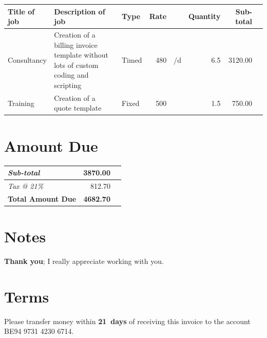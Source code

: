 \documentclass[a4paper,table]{article}
\begin{document}
\extrarowsep=1mm

\begin{center}
\label{tab:orgtable1}

\begin{tabu}{lXlrlrrl}
Title of job & Description of job & Type & Rate &  & Quantity & Sub-total & \\
\hline
Consultancy & Creation of a billing invoice template without lots of custom coding and scripting & Timed & 480 & \texteuro{}/d & 6.5 & 3120.00 & \texteuro{}\\
\hline
Training & Creation of a quote template & Fixed & 500 & \texteuro{} & 1.5 & 750.00 & \texteuro{}\\
\end{tabu}
\end{center}

\section*{Amount Due}
\label{sec:orgheadline2}

\hfill\colorbox{prlp-gray96}{\begin{minipage}{7.5cm}
\begin{center}
\begin{tabu}{Xrl}
\emph{Sub-total} & 3870.00 & \texteuro{}\\
\hline
\emph{Tax @ 21\%} & 812.70 & \texteuro{}\\
\hline
\textbf{Total Amount Due} & \textbf{\large{4682.70}} & \textbf{\texteuro{}}\\
\end{tabu}
\end{center}

\end{minipage}}

\section*{Notes}
\label{sec:orgheadline3}
\textbf{Thank you}; I really appreciate working with you.

\section*{Terms}
\label{sec:orgheadline4}

Please transfer money within \textbf{21~days} of receiving this invoice to the account
BE94 9731 4230 6714.
\end{document}
